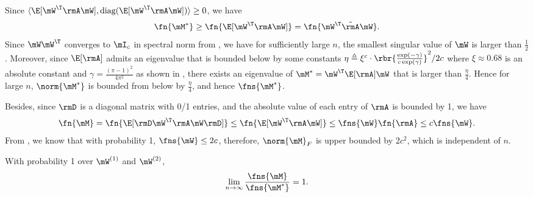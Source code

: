 \begin{proofof}{}
\begin{proofof}{}
Since $\langle\E[\mW^\T\rmA\mW],\text{diag}(\E[\mW^\T\rmA\mW])\rangle\geq0$, we have
\begin{equation}
    \fn{\mM^*}\geq\fn{\E[\mW^\T\rmA\mW]} = \fn{\mW^\T\tilde{\rmA}\mW}.
\end{equation}
Since $\mW\mW^\T$ converges to $\mI_c$ in spectral norm from , we have for sufficiently large $n$, the smallest singular value of $\mW$ is larger than $\frac12$. Moreover, since $\E[\rmA]$ admits an eigenvalue that is bounded below by some constants $\eta\triangleq \xi^c\cdot\rbr{\frac{\exp(-\gamma)}{c\exp(\gamma)}}^2/2c$ where $\xi\approx 0.68$ is an absolute constant and $\gamma=\frac{(\pi-1)^2}{4\pi^2}$ as shown in , there exists an eigenvalue of $\mM^* = \mW^\T\E[\rmA]\mW$ that is larger than $\frac{\eta}{4}$. Hence for large $n$, $\norm{\mM^*}$ is bounded from below by $\frac{\eta}{4}$, and hence $\fns{\mM^*}$.

Besides, since $\rmD$ is a diagonal matrix with 0/1 entries, and the absolute value of each entry of $\rmA$ is bounded by 1, we have
\begin{equation}
    \fn{\mM}=\fn{\E[\rmD\mW^\T\rmA\mW \rmD]}\leq\fn{\E[\mW^\T\rmA\mW]}\leq\fns{\mW}\fn{\rmA}\leq c\fns{\mW}.
\end{equation}
From , we know that with probability 1, $\fns{\mW}\leq 2c$, therefore, $\norm{\mM}_F$ is upper bounded by $2c^2$, which is independent of $n$.
\end{proofof}

\begin{lemma}
\label{lemma:M-equivalence}
With probability 1 over $\mW^{(1)}$ and $\mW^{(2)}$,
\[
\lim_{n\to\infty}\frac{\fns{\mM}}{\fns{\mM^*}}=1.
\]\end{lemma}
\begin{proofof}{}


\end{proofof}
\end{proofof}
